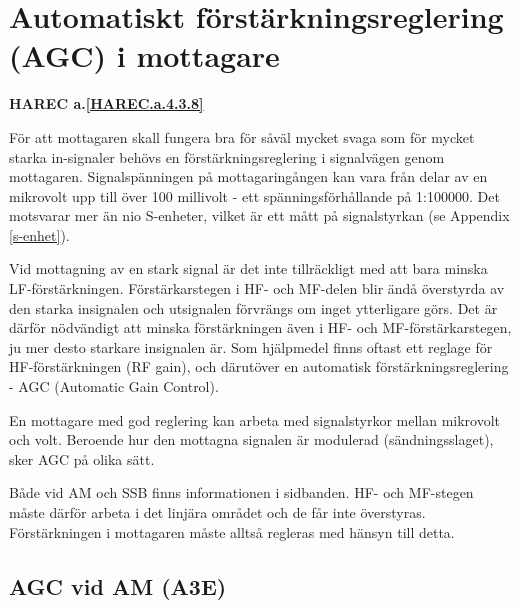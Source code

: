 \section{Automatiskt förstärkningsreglering (AGC) i mottagare}
\textbf{HAREC a.\ref{HAREC.a.4.3.8}\label{myHAREC.a.4.3.8}}

För att mottagaren skall fungera bra för såväl mycket svaga som för
mycket starka in-signaler behövs en förstärkningsreglering i
signalvägen genom mottagaren. Signalspänningen på mottagaringången kan
vara från delar av en mikrovolt upp till över 100 millivolt - ett
spänningsförhållande på 1:100000. Det motsvarar mer än nio S-enheter,
vilket är ett mått på signalstyrkan (se Appendix \ref{s-enhet}).

Vid mottagning av en stark signal är det inte tillräckligt med att
bara minska LF-förstärkningen. Förstärkarstegen i HF- och MF-delen
blir ändå överstyrda av den starka insignalen och utsignalen förvrängs
om inget ytterligare görs. Det är därför nödvändigt att minska
förstärkningen även i HF- och MF-förstärkarstegen, ju mer desto
starkare insignalen är. Som hjälpmedel finns oftast ett reglage för
HF-förstärkningen (RF gain), och därutöver en automatisk
förstärkningsreglering - AGC (Automatic Gain Control).

En mottagare med god reglering kan arbeta med signalstyrkor mellan
mikrovolt och volt. Beroende hur den mottagna signalen är modulerad
(sändningsslaget), sker AGC på olika sätt.

Både vid AM och SSB finns informationen i sidbanden. HF- och MF-stegen
måste därför arbeta i det linjära området och de får inte
överstyras. Förstärkningen i mottagaren måste alltså regleras med
hänsyn till detta.

\subsection{AGC vid AM (A3E)}

